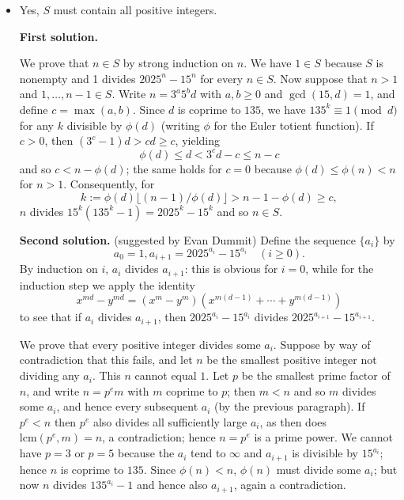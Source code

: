 \documentclass[amssymb,twocolumn,pra,10pt,aps]{revtex4-1}
\begin{document}
\begin{itemize}
\item[B3]
Yes, $S$ must contain all positive integers.

\noindent
\textbf{First solution.}

We prove that $n \in S$ by strong induction on $n$. We have $1 \in S$ because $S$ is nonempty and 1 divides $2025^n-15^n$ for every $n \in S$. Now suppose that $n > 1$ and $1,\dots,n-1 \in S$.
Write $n = 3^a 5^b d$ with $a,b\geq 0$ and $\gcd(15,d)=1$, and define $c = \max(a,b)$.
Since  $d$ is coprime to $135$, we have $135^k \equiv 1 \pmod{d}$ for any $k$ divisible by $\phi(d)$ (writing $\phi$ for the Euler totient function). If $c>0$, then $(3^c-1)d > cd \geq c$, yielding
\[
\phi(d) \leq d < 3^c d - c \leq n-c
\]
and so $c < n - \phi(d)$; the same holds for $c=0$ because $\phi(d) \leq \phi(n) < n$ for $n>1$. Consequently, for
\[
k := \phi(d) \lfloor (n-1)/\phi(d) \rfloor > n-1-\phi(d) \geq c,
\]
$n$ divides $15^k (135^k-1) = 2025^k - 15^k$ and so $n \in S$.

\noindent
\textbf{Second solution.} (suggested by Evan Dummit)
Define the sequence $\{a_i\}$ by 
\[
a_0 = 1, a_{i+1} = 2025^{a_i} - 15^{a_i} \quad (i \geq 0).
\]
By induction on $i$, $a_i$ divides $a_{i+1}$: this is obvious for $i=0$, while for the induction step we apply the identity
\[
x^{md}-y^{md} = (x^m-y^m)(x^{m(d-1)} + \cdots + y^{m(d-1)})
\]
to see that if $a_i$ divides $a_{i+1}$, then $2025^{a_i}-15^{a_i}$ divides $2025^{a_{i+1}}-15^{a_{i+1}}$.

We prove that every positive integer divides some $a_i$. Suppose by way of contradiction that this fails, and let $n$ be the smallest positive integer not dividing any $a_i$. This $n$ cannot equal $1$.
Let $p$ be the smallest prime factor of $n$, and write $n = p^e m$ with $m$ coprime to $p$;
then $m < n$ and so $m$ divides some $a_i$, and hence every subsequent $a_i$ (by the previous paragraph). If $p^e < n$ then $p^e$ also divides all sufficiently large $a_i$, as then does $\mathrm{lcm}(p^e, m) = n$, a contradiction; hence $n = p^e$ is a prime power. We cannot have $p=3$ or $p=5$ because the $a_i$ tend to $\infty$ and $a_{i+1}$ is divisible by $15^{a_i}$; hence $n$ is coprime to $135$.
Since $\phi(n) < n$, $\phi(n)$ must divide some $a_i$; but now $n$ divides $135^{a_i}-1$ and hence also $a_{i+1}$, again a contradiction.


\end{itemize}
\end{document}
